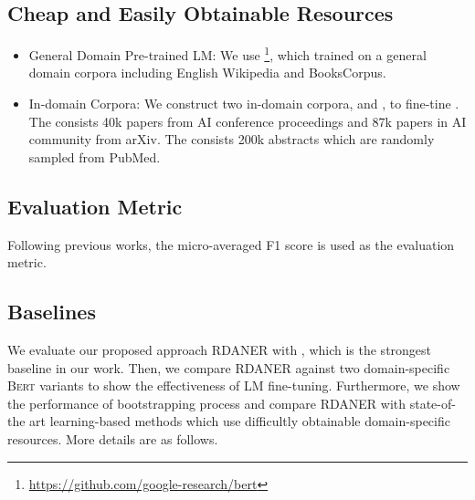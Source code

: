 \documentclass[10pt, conference, compsocconf]{IEEEtran}
\newcommand{\bert}{\textsc{Bert}\xspace}
\newcommand{\rdaner}{\textsc{RDANER}\xspace}
\newcommand{\bio}{\xspace}
\newcommand{\cs}{\xspace}
\newcommand{\bertbase}{\xspace}
\begin{document}
\subsection{Cheap and Easily Obtainable Resources}
\begin{itemize}
    \item General Domain Pre-trained LM: We use \bertbase\footnote{\url{https://github.com/google-research/bert}},
        which trained on a general domain corpora including 
        English Wikipedia and BooksCorpus. 
\item In-domain Corpora: We construct two in-domain corpora, \cs and \bio, to fine-tine \bertbase. 
      The \cs consists 40k papers from AI conference proceedings and 87k papers in AI community from arXiv.
       The \bio consists 200k abstracts which are randomly sampled from PubMed.
\end{itemize}


\subsection{Evaluation Metric} Following previous works\cite{zhou-etal-2019-dual,beltagy-etal-2019-scibert,chaudhary-etal-2019-little}, the micro-averaged F1 score is used as
the evaluation metric. 

\subsection{Baselines}
We evaluate our proposed approach \rdaner with \bertbase, which is the strongest baseline in our work.
Then, we compare \rdaner against two domain-specific \bert variants to show the 
effectiveness of LM fine-tuning.
Furthermore, we show the performance of bootstrapping process and
compare \rdaner with state-of-the art learning-based methods which use difficultly obtainable domain-specific resources.
More details are as follows.
\end{document}

